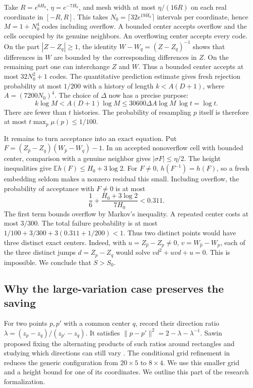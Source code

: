 \documentclass[11pt,letterpaper,oneside,reqno]{amsart}
\theoremstyle{definition}
\begin{document}
Take \(R=e^{6H_0}\), \(\eta=e^{-7H_0}\), and mesh width at most
\(\eta/(16R)\) on each real coordinate in \([-R,R]\). This takes
\(N_0=\lceil32e^{19H_0}\rceil\) intervals per coordinate, hence
\(M=1+N_0^4\) codes including overflow. A bounded center accepts
overflow and the cells occupied by its genuine neighbors. An overflowing
center accepts every code. On the part \(|Z-Z_q|\ge1\), the identity
\(W-W_q=(Z-Z_q)^{-1}\) shows that differences in \(W\) are bounded by
the corresponding differences in \(Z\). On the remaining part one can
interchange \(Z\) and \(W\). Thus a bounded center accepts at most
\(32N_0^2+1\) codes. The quantitative prediction estimate gives fresh
rejection probability at most \(1/200\) with a history of length
\(k<A(D+1)\), where \(A=(7200N_0)^4\). The choice of \(\Delta\) now
has a precise purpose:
\begin{equation}\label{eq:balance}
 k\log M<A(D+1)\log M
 \le 30600\Delta A\log M\,\log t=\log t .
\end{equation}
There are fewer than \(t\) histories. The probability of resampling
\(p\) itself is therefore at most \(t\max_p\mu(p)\le1/100\).

It remains to turn acceptance into an exact equation. Put
\(F=(Z_{\widehat p}-Z_q)(W_{\widehat p}-W_q)-1\).
In an accepted nonoverflow cell with bounded center, comparison with a
genuine neighbor gives \(|\sigma F|\le\eta/2\). The height inequalities
give \(\mathbb E h(F)\le H_0+3\log2\). For \(F\ne0\),
\(h(F^{-1})=h(F)\), so a fresh embedding seldom makes a nonzero
residual this small. Including overflow, the probability of acceptance
with \(F\ne0\) is at most
\[
 \frac16+\frac{H_0+3\log2}{7H_0}<0.311 .
\]
The first term bounds overflow by Markov's inequality. A repeated
center costs at most \(3/300\). The total failure probability is at most
\(1/100+3/300+3(0.311+1/200)<1\). Thus two distinct points would
have three distinct exact centers. Indeed, with
\(u=Z_{\widehat p}-Z_p\ne0\), \(v=W_{\widehat p}-W_p\), each of the
three distinct jumps \(d=Z_p-Z_q\) would solve \(vd^2+uvd+u=0\).
This is impossible. We conclude that \(S>S_0\).

\subsection{Why the large-variation case preserves the saving}
For two points \(p,p'\) with a common center \(q\), record their direction
ratio \(\lambda=(z_p-z_q)/(z_{p'}-z_q)\). It satisfies
\(\lVert p-p'\rVert^2=2-\lambda-\lambda^{-1}\). Sawin proposed fixing
the alternating products of such ratios around rectangles and studying
which directions can still vary \cite[post 9389]{sawin}. The conditional
grid refinement in \cite{arun} reduces the generic configuration from
\(20\times5\) to \(8\times4\). We use this smaller grid and a height
bound for one of its coordinates. We outline this part of the research
formalization.
\end{document}
